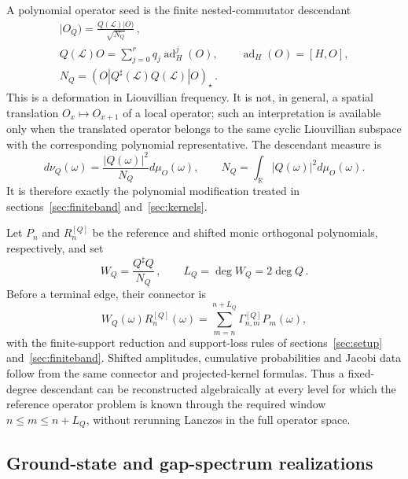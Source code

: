 \documentclass[a4paper,11pt]{article}
\def\dd{d}%
\theoremstyle{definition}
\theoremstyle{remark}
\newcommand{\dd}{\mathrm d}
\newcommand{\RR}{\mathbb R}
\newcommand{\Qsh}{Q^{\sharp}}
\begin{document}
A polynomial operator seed is the finite nested-commutator descendant
\begin{equation}
\begin{gathered}
   |O_Q)=\frac{Q(\mathcal L)|O)}{\sqrt{N_Q}}\,,\\
   Q(\mathcal L)O
   =\sum_{j=0}^{r}q_j\operatorname{ad}_H^j(O),
   \qquad
   \operatorname{ad}_H(O)=[H,O],\\
   N_Q=(O|\Qsh(\mathcal L)Q(\mathcal L)|O)_\star\,.
\end{gathered}
   \label{eq:operator-polynomial-seed-app}
\end{equation}
This is a deformation in Liouvillian frequency.  It is not, in general,
a spatial translation $O_x\mapsto O_{x+1}$ of a local operator; such an
interpretation is available only when the translated operator belongs to
the same cyclic Liouvillian subspace with the corresponding polynomial
representative.  The descendant measure is
\begin{equation}
   \dd\nu_Q(\omega)
   =\frac{|Q(\omega)|^2}{N_Q}\dd\mu_O(\omega),
   \qquad
   N_Q=\int_{\RR}|Q(\omega)|^2\dd\mu_O(\omega).
   \label{eq:operator-christoffel-measure-app}
\end{equation}
It is therefore exactly the polynomial modification treated in
sections~\ref{sec:finiteband} and~\ref{sec:kernels}.

Let $P_n$ and $R_n^{[Q]}$ be the reference and shifted monic orthogonal
polynomials, respectively, and set
\begin{equation}
   W_Q=\frac{\Qsh Q}{N_Q}\,,
   \qquad
   L_Q=\deg W_Q=2\deg Q\,.
\end{equation}
Before a terminal edge, their connector is
\begin{equation}
   W_Q(\omega)R_n^{[Q]}(\omega)
   =\sum_{m=n}^{n+L_Q}
      \Gamma_{n,m}^{[Q]}P_m(\omega),
   \label{eq:operator-connector-app}
\end{equation}
with the finite-support reduction and support-loss rules of
sections~\ref{sec:setup} and~\ref{sec:finiteband}.  Shifted amplitudes,
cumulative probabilities and Jacobi data follow from the same connector
and projected-kernel formulas.  Thus a fixed-degree descendant can be
reconstructed algebraically at every level for which the reference
operator problem is known through the required window
$n\le m\le n+L_Q$, without rerunning Lanczos in the full operator space.

\subsection{Ground-state and gap-spectrum realizations}
\label{app:operator-realizations}
\end{document}
